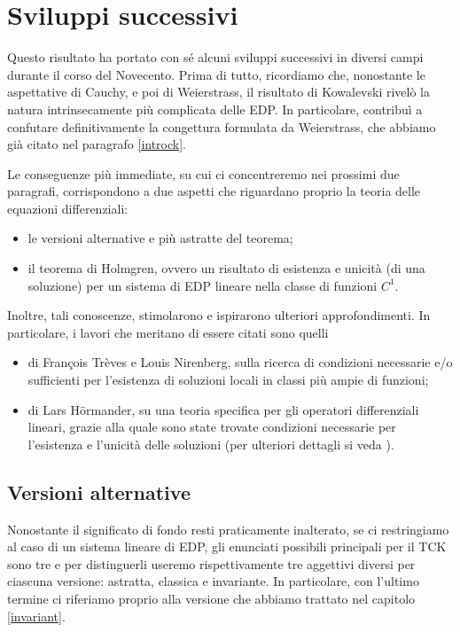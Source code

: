 \chapter{Sviluppi successivi}

Questo risultato ha portato con sé alcuni sviluppi successivi in diversi campi durante il corso del Novecento. 
Prima di tutto, ricordiamo che, nonostante le aspettative di Cauchy, e poi di Weierstrass, il risultato di Kowalevski rivelò la natura intrinsecamente più complicata delle EDP. In particolare, contribuì a confutare definitivamente la congettura formulata da Weierstrass, che abbiamo già citato nel paragrafo \ref{introck}.

Le conseguenze più immediate, su cui ci concentreremo nei prossimi due paragrafi, corrispondono a due aspetti che riguardano proprio la teoria delle equazioni differenziali:
\begin{itemize}
\item le versioni alternative e più astratte del teorema;
\item il teorema di Holmgren, ovvero un risultato di esistenza e unicità (di una soluzione) per un sistema di EDP lineare nella classe di funzioni $C^1$.
\end{itemize}

Inoltre, tali conoscenze, stimolarono e ispirarono ulteriori approfondimenti. In particolare, i lavori che meritano di essere citati sono quelli
\begin{itemize}
\item di François Trèves e Louis Nirenberg, sulla ricerca di condizioni necessarie e/o sufficienti per l'esistenza di soluzioni locali in classi più ampie di funzioni;
\item di Lars Hörmander, su una teoria specifica per gli operatori differenziali lineari, grazie alla quale sono state trovate condizioni necessarie per l'esistenza e l'unicità delle soluzioni (per ulteriori dettagli si veda \cite{Hormander}).
\end{itemize}

\newpage
\section{Versioni alternative}

Nonostante il significato di fondo resti praticamente inalterato, se ci restringiamo al caso di un sistema lineare di EDP, gli enunciati possibili principali per il TCK sono tre e per distinguerli useremo rispettivamente tre aggettivi diversi per ciascuna versione: astratta, classica e invariante. In particolare, con l'ultimo termine ci riferiamo proprio alla versione che abbiamo trattato nel capitolo \ref{invariant}.

